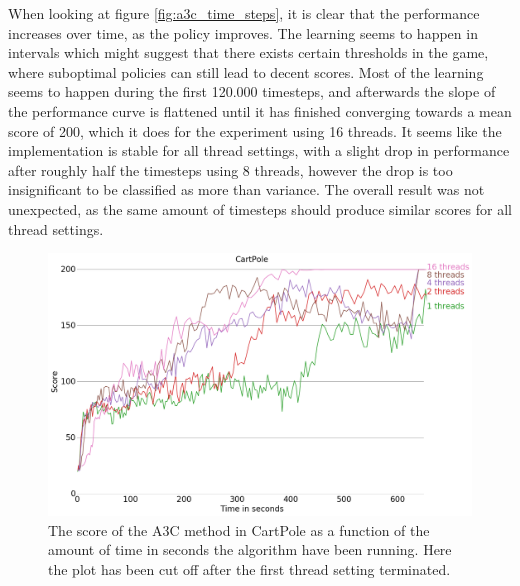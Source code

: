 \documentclass[11pt]{article}
\begin{document}
When looking at figure \ref{fig:a3c_time_steps}, it is clear that the
performance increases over time, as the policy improves.
The learning seems to happen in intervals which might suggest
that there exists certain thresholds in the game, where
suboptimal policies can still lead to decent scores.
Most of the learning seems to happen during the first 120.000 timesteps,
and afterwards the slope of the performance curve
is flattened until it has finished converging towards a mean score
of 200, which it does for the experiment using 16 threads.
It seems like the implementation is stable for all thread settings, with a slight
drop in performance after roughly half the timesteps using 8 threads,
however the drop is too insignificant to be classified as more than variance.
The overall result was not unexpected, as the same amount of timesteps should produce similar
scores for all thread settings. 

\begin{figure}[H]
    \centering
    \includegraphics[scale=0.4]{plots/cartpole_compare_time_without_AC.png}
    \caption{The score of the A3C method in CartPole as a function
    of the amount of time in seconds the algorithm have been running.
    Here the plot has been cut off after the first thread setting
    terminated.}
    \label{fig:a3c_time}
\end{figure}
\end{document}
